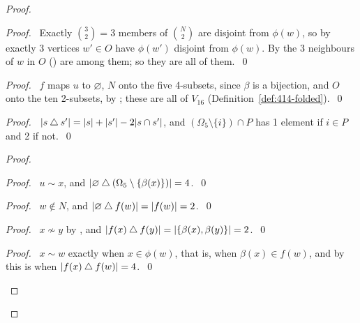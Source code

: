 \begin{proof}
 \begin{proof}\pf\ Exactly $\binom32=3$ members of $\binom N2$ are disjoint from $\phi(w)$, so by
   exactly 3 vertices $w'\in O$ have $\phi(w')$ disjoint from $\phi(w)$. By
   the 3 neighbours of $w$ in $O$ () are among them;
  so they are all of them.~\qed\end{proof}
 \begin{proof}\pf\ $f$ maps $u$ to $\varnothing$, $N$ onto the five 4-subsets, since $\beta$ is a
  bijection, and $O$ onto the ten 2-subsets, by ; these are all of $V_{16}$
  (Definition~\ref{def:414-folded}).~\qed\end{proof}
 \begin{proof}\pf\ $|s\mathbin{\triangle} s'|=|s|+|s'|-2|s\cap s'|$, and $(\Omega_5\setminus\{i\})\cap P$ has 1
  element if $i\in P$ and 2 if not.~\qed\end{proof}
 \begin{proof}
  \begin{proof}\pf\ $u\sim x$, and $|\varnothing\mathbin{\triangle}(\Omega_5\setminus\{\beta(x)\})|=4$.~\qed\end{proof}
  \begin{proof}\pf\ $w\notin N$, and $|\varnothing\mathbin{\triangle} f(w)|=|f(w)|=2$.~\qed\end{proof}
  \begin{proof}\pf\ $x\not\sim y$ by , and
   $|f(x)\mathbin{\triangle} f(y)|=|\{\beta(x),\beta(y)\}|=2$.~\qed\end{proof}
  \begin{proof}\pf\ $x\sim w$ exactly when $x\in\phi(w)$, that is, when $\beta(x)\in f(w)$, and
   by  this is when $|f(x)\mathbin{\triangle} f(w)|=4$.~\qed\end{proof}

\end{proof}
\end{proof}

